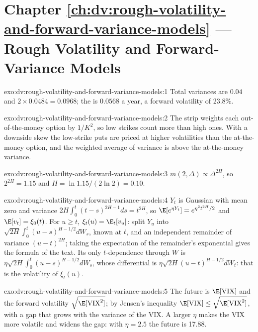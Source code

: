 \section*{Chapter \ref{ch:dv:rough-volatility-and-forward-variance-models} --- Rough Volatility and Forward-Variance Models}

\begin{solution}{exo:dv:rough-volatility-and-forward-variance-models:1}
Total variances are $0.04$ and $2\times0.0484=0.0968$; the  is $0.0568$ a year, a forward
volatility of 23.8\%.
\end{solution}

\begin{solution}{exo:dv:rough-volatility-and-forward-variance-models:2}
The strip weights each out-of-the-money option by $1/K^2$, so low strikes count more than high ones. With a
downside skew the low-strike puts are priced at higher volatilities than the at-the-money option, and the
weighted average of variance is above the at-the-money variance.
\end{solution}

\begin{solution}{exo:dv:rough-volatility-and-forward-variance-models:3}
$m(2,\Delta)\propto\Delta^{2H}$, so $2^{2H}=1.15$ and $H=\ln1.15/(2\ln2)=0.10$.
\end{solution}

\begin{solution}{exo:dv:rough-volatility-and-forward-variance-models:4}
$Y_t$ is Gaussian with mean zero and variance $2H\int_0^t(t-s)^{2H-1}ds=t^{2H}$, so
$\E[e^{\eta Y_t}]=e^{\eta^2t^{2H}/2}$ and $\E[v_t]=\xi_0(t)$. For $u\ge t$,
$\xi_t(u)=\E_t[v_u]$: split $Y_u$ into $\sqrt{2H}\int_0^t(u-s)^{H-1/2}dW_s$, known at $t$, and an independent
remainder of variance $(u-t)^{2H}$; taking the expectation of the remainder's exponential gives the formula of
the text. Its only $t$-dependence through $W$ is $\eta\sqrt{2H}\int_0^t(u-s)^{H-1/2}dW_s$, whose differential is
$\eta\sqrt{2H}(u-t)^{H-1/2}dW_t$: that is the volatility of $\xi_t(u)$.
\end{solution}

\begin{solution}{exo:dv:rough-volatility-and-forward-variance-models:5}
The future is $\E[\mathrm{VIX}]$ and the forward volatility $\sqrt{\E[\mathrm{VIX}^2]}$; by Jensen's inequality
$\E[\mathrm{VIX}]\le\sqrt{\E[\mathrm{VIX}^2]}$, with a gap that grows with the variance of the VIX. A larger
$\eta$ makes the VIX more volatile and widens the gap: with $\eta=2.5$ the future is 17.88.
\end{solution}

